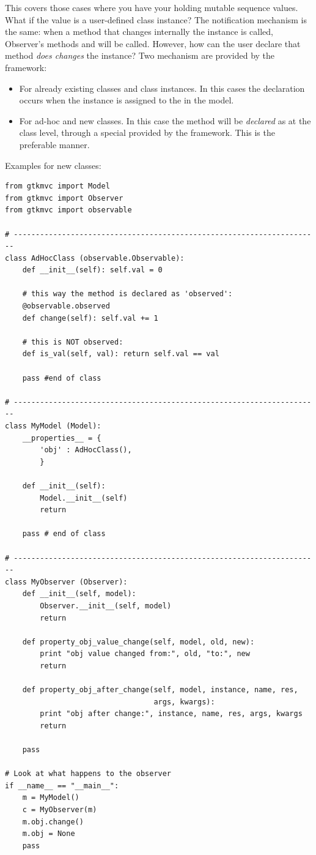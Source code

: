 This covers those cases where you have your \OPS holding mutable
sequence values. What if the value is a user-defined class instance?
The notification mechanism is the same: when a method 
that changes internally the instance is called, Observer's methods
 and  will be called. However, how can the user
declare that method  \emph{does changes} the instance?
Two mechanism are provided by the framework:
\begin{itemize}
\item For already existing classes and class instances. In this cases
  the declaration occurs when the instance is assigned to the \OP in
  the model.
\item For ad-hoc and new classes. In this case the method will be
  \emph{declared} as  at the class level, through a
  special  provided by the framework. This is the
  preferable manner. 
\end{itemize}

Examples for new classes:

{ \codesize 
\begin{verbatim} 
from gtkmvc import Model
from gtkmvc import Observer
from gtkmvc import observable

# ----------------------------------------------------------------------
class AdHocClass (observable.Observable):
    def __init__(self): self.val = 0

    # this way the method is declared as 'observed':
    @observable.observed 
    def change(self): self.val += 1

    # this is NOT observed:
    def is_val(self, val): return self.val == val

    pass #end of class

# ----------------------------------------------------------------------
class MyModel (Model):
    __properties__ = {
        'obj' : AdHocClass(),
        }

    def __init__(self):
        Model.__init__(self)
        return    

    pass # end of class

# ----------------------------------------------------------------------
class MyObserver (Observer):
    def __init__(self, model):
        Observer.__init__(self, model)
        return

    def property_obj_value_change(self, model, old, new):
        print "obj value changed from:", old, "to:", new 
        return

    def property_obj_after_change(self, model, instance, name, res,
                                  args, kwargs):
        print "obj after change:", instance, name, res, args, kwargs
        return

    pass

# Look at what happens to the observer
if __name__ == "__main__":
    m = MyModel()
    c = MyObserver(m)
    m.obj.change()
    m.obj = None
    pass
\end{verbatim}
}

